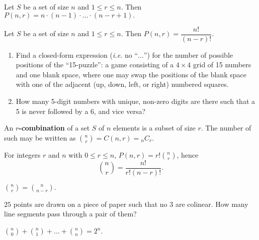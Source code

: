 \begin{theorem} Let $S$ be a set of size $n$ and $1 \leq r \leq n$.  Then $P(n, r) = n \cdot (n-1) \cdot \ldots \cdot (n-r+1).$
\end{theorem}

\begin{corollary} Let $S$ be a set of size $n$ and $1 \leq r \leq n$.  Then $P(n, r) = \dfrac{n!}{(n-r)!}.$
\end{corollary}

\begin{exercises}\leavevmode
\begin{enumerate}
    \item Find a closed-form expression (\textit{i.e.} no ``$\ldots$'') for the number of possible positions of the ``15-puzzle'': a game consisting of a $4\times 4$ grid of 15 numbers and one blank space, where one may swap the positions of the blank space with one of the adjacent (up, down, left, or right) numbered squares.
    \item How many 5-digit numbers with unique, non-zero digits are there such that a 5 is never followed by a 6, and vice versa?
\end{enumerate}
\end{exercises}

\begin{definition} An \textbf{$r$-combination} of a set $S$ of $n$ elements is a subset of size $r$.  The number of such may be written as ${{n}\choose{r}} = C(n, r) = {}_n C_r$.
\end{definition}

\begin{theorem}For integers $r$ and $n$ with $0 \leq r \leq n$, $P(n, r) = r! {{n}\choose{r}}$, hence $${{n}\choose{r}} = \dfrac{n!}{r!(n-r)!}.$$
\end{theorem}

\begin{corollary} ${{n}\choose{r}} = {{n}\choose{n-r}}.$
\end{corollary}

\begin{example} $25$ points are drawn on a piece of paper such that no 3 are colinear.  How many line segments pass through a pair of them?
\end{example}

\begin{theorem} ${{n}\choose{0}} + {{n}\choose{1}} + \ldots + {{n}\choose{n}} = 2^n$.
\end{theorem}

